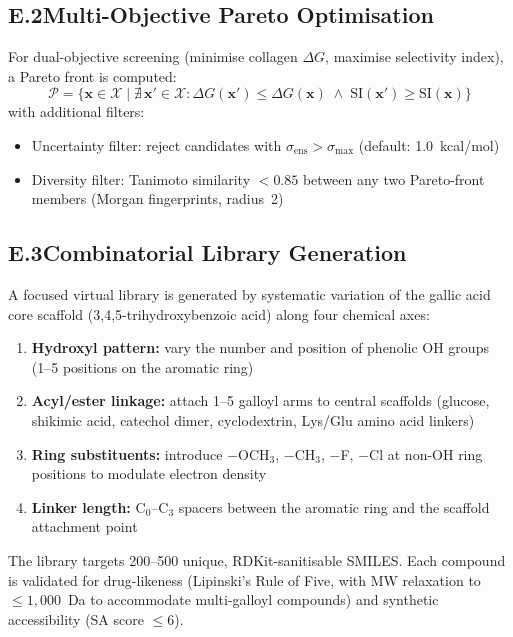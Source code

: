 \documentclass[11pt]{article}
\begin{document}
\subsection*{E.2\quad Multi-Objective Pareto Optimisation}

For dual-objective screening (minimise collagen $\Delta G$, maximise
selectivity index), a Pareto front is computed:
\begin{equation}
  \mathcal{P} = \bigl\{ \mathbf{x} \in \mathcal{X} \mid
  \nexists\, \mathbf{x}' \in \mathcal{X}:
  \Delta G(\mathbf{x}') \leq \Delta G(\mathbf{x}) \;\wedge\;
  \text{SI}(\mathbf{x}') \geq \text{SI}(\mathbf{x})
  \bigr\}
  \label{eq:pareto}
\end{equation}
with additional filters:
\begin{itemize}[leftmargin=1.5em]
  \item Uncertainty filter: reject candidates with
    $\sigma_{\mathrm{ens}} > \sigma_{\max}$ (default: 1.0~kcal/mol)
  \item Diversity filter: Tanimoto similarity $< 0.85$ between any
    two Pareto-front members (Morgan fingerprints, radius~2)
\end{itemize}

\subsection*{E.3\quad Combinatorial Library Generation}

A focused virtual library is generated by systematic variation of the
gallic acid core scaffold (3,4,5-trihydroxybenzoic acid) along four
chemical axes:

\begin{enumerate}[leftmargin=1.5em]
  \item \textbf{Hydroxyl pattern:} vary the number and position of
    phenolic OH groups (1--5 positions on the aromatic ring)
  \item \textbf{Acyl/ester linkage:} attach 1--5 galloyl arms to
    central scaffolds (glucose, shikimic acid, catechol dimer,
    cyclodextrin, Lys/Glu amino acid linkers)
  \item \textbf{Ring substituents:} introduce $-$OCH$_3$, $-$CH$_3$,
    $-$F, $-$Cl at non-OH ring positions to modulate electron density
  \item \textbf{Linker length:} C$_0$--C$_3$ spacers between the
    aromatic ring and the scaffold attachment point
\end{enumerate}

\noindent
The library targets 200--500 unique, RDKit-sanitisable SMILES.
Each compound is validated for drug-likeness (Lipinski's Rule of Five,
with MW relaxation to $\leq 1{,}000$~Da to accommodate multi-galloyl
compounds) and synthetic accessibility (SA score $\leq 6$).
\end{document}
